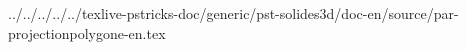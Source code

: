../../../../../texlive-pstricks-doc/generic/pst-solides3d/doc-en/source/par-projectionpolygone-en.tex